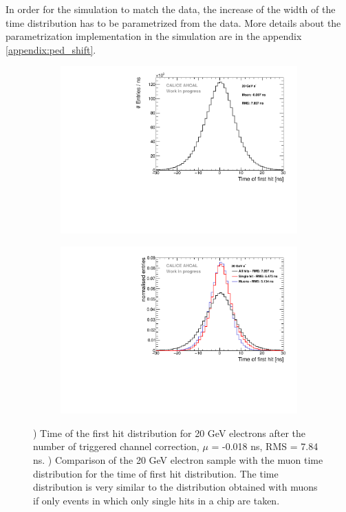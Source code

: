 In order for the simulation to match the data, the increase of the width of the time distribution has to be parametrized from the data. More details about the parametrization implementation in the simulation are in the appendix \ref{appendix:ped_shift}.

\begin{figure}[htbp!]
	\begin{subfigure}[t]{0.5\textwidth}
		\centering
		\includegraphics[width=1\textwidth]{../Thesis_Plots/Timing/Electrons/Plots/Timing_AllLayers_20GeV.pdf}
		\caption{}\label{fig:timing_electrons_corr}
	\end{subfigure}
	\hfill
	\begin{subfigure}[t]{0.5\textwidth}
		\centering
		\includegraphics[width=1\textwidth]{../Thesis_Plots/Timing/Electrons/Plots/ComparisonAll_ElectronsSingleHit.pdf}
		\caption{}\label{fig:timing_electron_muon_comp}
	\end{subfigure}
	\caption{) Time of the first hit distribution for 20 GeV electrons after the number of triggered channel correction, $\mu$ = -0.018 ns, RMS = 7.84 ns. ) Comparison of the 20 GeV electron sample with the muon time distribution for the time of first hit distribution. The time distribution is very similar to the distribution obtained with muons if only events in which only single hits in a chip are taken.}
\end{figure}

